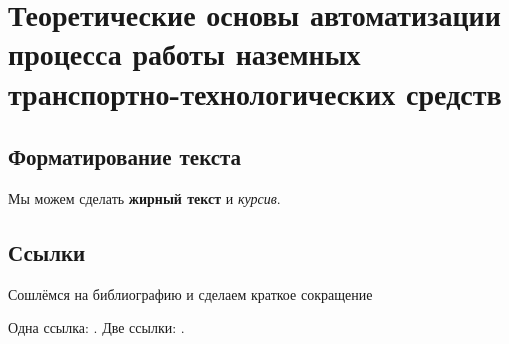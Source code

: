 \chapter{Теоретические основы автоматизации процесса работы наземных транспортно-технологических средств}\label{ch:ch1}

\section{Форматирование текста}\label{sec:ch1/sec1}

Мы можем сделать \textbf{жирный текст} и \textit{курсив}.

\section{Ссылки}\label{sec:ch1/sec2}

Сошлёмся на библиографию и сделаем краткое сокращение 

Одна ссылка: \cite[с.~39]{Evtukov}.
Две ссылки: \cite{doi:10.36652/1684-1298-2023-36-39,Baumana}.

\FloatBarrier
